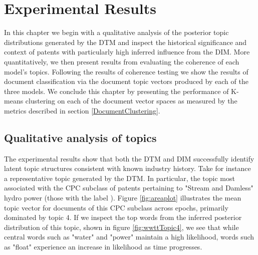 
\chapter{Experimental Results} %

\label{Chapter4} %
In this chapter we begin with a qualitative analysis of the posterior topic distributions generated by the DTM and inspect the historical significance and context of patents with particularly high inferred influence from the DIM. More quantitatively, we then present results from evaluating the coherence of each model's topics. Following the results of coherence testing we show the results of document classification via the document topic vectors produced by each of the three models. We conclude this chapter by presenting the performance of K-means clustering on each of the document vector spaces as measured by the metrics described in section \ref{DocumentClustering}.


\section{Qualitative analysis of topics}
%

The experimental results show that both the DTM and DIM successfully identify latent topic structures consistent with known industry history. Take for instance a representative topic generated by the DTM. In particular, the topic most associated with the CPC subclass of patents pertaining to "Stream and Damless" hydro power (those with the label ). Figure \ref{fig:areaplot} illustrates the mean topic vector for documents of this CPC subclass across epochs, primarily dominated by topic 4. If we inspect the top words from the inferred posterior distribution of this topic, shown in figure \ref{fig:wwttTopic4}, we see that while central words such as "water" and "power" maintain a high likelihood, words such as "float" experience an increase in likelihood as time progresses. 


